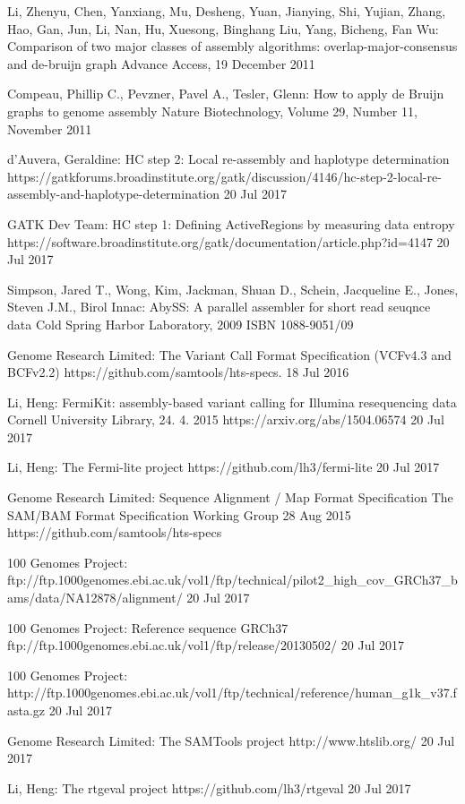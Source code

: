 \begin{thebibliography}{99}

Li, Zhenyu, Chen, Yanxiang, Mu, Desheng, Yuan, Jianying, Shi, Yujian, Zhang, Hao, Gan, Jun, Li, Nan, Hu, Xuesong, Binghang Liu, Yang, Bicheng, Fan Wu:
Comparison of two major classes of assembly algorithms: overlap-major-consensus and de-bruijn graph
Advance Access, 19 December 2011

Compeau, Phillip C., Pevzner, Pavel A., Tesler, Glenn:
How to apply de Bruijn graphs to genome assembly
Nature Biotechnology, Volume 29, Number 11, November 2011

d'Auvera, Geraldine: HC step 2: Local re-assembly and haplotype determination
https://gatkforums.broadinstitute.org/gatk/discussion/4146/hc-step-2-local-re-assembly-and-haplotype-determination
20 Jul 2017

GATK Dev Team: HC step 1: Defining ActiveRegions by measuring data entropy
https://software.broadinstitute.org/gatk/documentation/article.php?id=4147
20 Jul 2017

Simpson, Jared T., Wong, Kim, Jackman, Shuan D., Schein, Jacqueline E., Jones, Steven J.M., Birol Innac: 
AbySS: A parallel assembler for short read seuqnce data
Cold Spring Harbor Laboratory, 2009
ISBN 1088-9051/09

Genome Research Limited: The Variant Call Format Specification (VCFv4.3 and BCFv2.2)
https://github.com/samtools/hts-specs.
18 Jul 2016

Li, Heng: FermiKit: assembly-based variant calling for Illumina resequencing data
Cornell University Library, 24. 4. 2015
https://arxiv.org/abs/1504.06574
20 Jul 2017

Li, Heng: The Fermi-lite project
https://github.com/lh3/fermi-lite
20 Jul 2017

Genome Research Limited: Sequence Alignment / Map Format Specification
The SAM/BAM Format Specification Working Group
28 Aug 2015
https://github.com/samtools/hts-specs

100 Genomes Project: 
ftp://ftp.1000genomes.ebi.ac.uk/vol1/ftp/technical/pilot2\_high\_cov\_GRCh37\_bams/data/NA12878/alignment/
20 Jul 2017

100 Genomes Project: Reference sequence GRCh37
ftp://ftp.1000genomes.ebi.ac.uk/vol1/ftp/release/20130502/
20 Jul 2017

100 Genomes Project: 
http://ftp.1000genomes.ebi.ac.uk/vol1/ftp/technical/reference/human\_g1k\_v37.fasta.gz
20 Jul 2017

Genome Research Limited: The SAMTools project
http://www.htslib.org/
20 Jul 2017

Li, Heng: The rtgeval project
https://github.com/lh3/rtgeval
20 Jul 2017


\end{thebibliography}
